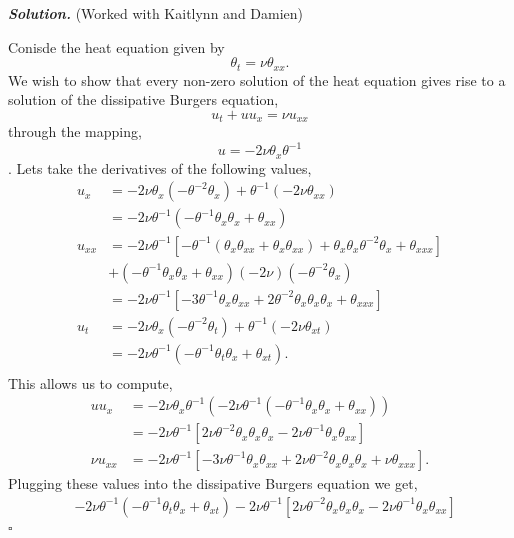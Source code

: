\documentclass[12pt]{report}
\newenvironment{solution}[1][\it{Solution}]{\textbf{#1. } }{$\square$}
\begin{document}
\begin{solution}
    (Worked with Kaitlynn and Damien)

    \noindent
    Conisde the heat equation given by $$\theta_t = \nu \theta_{xx}.$$ 
    We wish to show that every non-zero solution of the heat equation gives rise to a solution of the dissipative Burgers equation,
    $$u_t + u u_{x} = \nu u_{xx}$$
    through the mapping,
    $$u = -2\nu \theta_x\theta^{-1}$$.
    Lets take the derivatives of the following values,
    \begin{align*}
        u_x &= -2\nu\theta_{x}(-\theta^{-2}\theta_{x}) + \theta^{-1}(-2\nu\theta_{xx})\\
            &= -2\nu\theta^{-1}(-\theta^{-1}\theta_{x}\theta_{x} + \theta_{xx})\\
        u_{xx} &= -2\nu\theta^{-1}\left[ -\theta^{-1} \left( \theta_x\theta_{xx} + \theta_x\theta_{xx}\right) + \theta_x\theta_x \theta^{-2}\theta_x + \theta_{xxx}\right]\\
            &+ (-\theta^{-1}\theta_{x}\theta_{x} + \theta_{xx})(-2\nu)(-\theta^{-2}\theta_{x})\\
            &= -2\nu\theta^{-1}\left[ -3\theta^{-1}\theta_x\theta_{xx} + 2\theta^{-2}\theta_{x}\theta_{x}\theta_{x} + \theta_{xxx}\right]\\
        u_t &= -2\nu\theta_{x}(-\theta^{-2}\theta_{t}) + \theta^{-1}(-2\nu\theta_{xt})\\
            &= -2\nu\theta^{-1}(-\theta^{-1}\theta_{t}\theta_{x} + \theta_{xt}).\\
    \end{align*}
    This allows us to compute,
    \begin{align*}
        uu_x &= -2\nu\theta_{x}\theta^{-1} \left( -2\nu\theta^{-1}(-\theta^{-1}\theta_{x}\theta_{x} + \theta_{xx})\right)\\
        &= -2\nu\theta^{-1} \left[ 2\nu \theta^{-2}\theta_x\theta_x\theta_x - 2\nu \theta^{-1}\theta_x\theta_{xx}\right]\\
        \nu u_{xx} &= -2\nu\theta^{-1}\left[ -3\nu\theta^{-1}\theta_x\theta_{xx} + 2\nu\theta^{-2}\theta_{x}\theta_{x}\theta_{x} + \nu\theta_{xxx}\right].
    \end{align*}
    Plugging these values into the dissipative Burgers equation we get,
    \begin{align*}
        &-2\nu\theta^{-1}(-\theta^{-1}\theta_{t}\theta_{x} + \theta_{xt}) -2\nu\theta^{-1} \left[ 2\nu \theta^{-2}\theta_x\theta_x\theta_x - 2\nu \theta^{-1}\theta_x\theta_{xx}\right]\\

\end{align*}
\end{solution}
\end{document}
